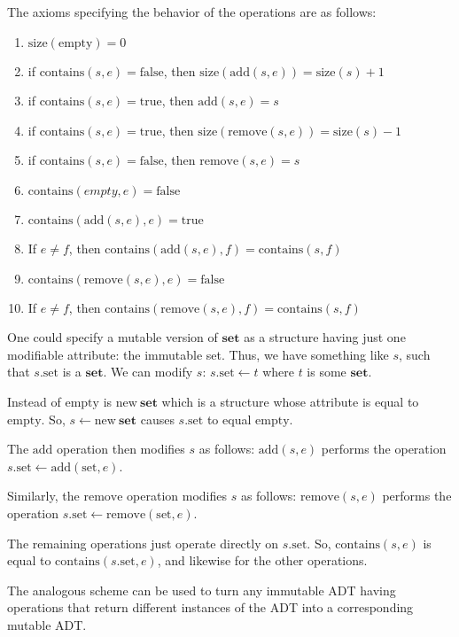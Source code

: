 \documentclass{amsart}
\begin{document}
The axioms specifying the behavior of the operations are as follows:

\begin{enumerate}
\item $\mathrm{size}(\mathrm{empty})=0$
\item if $\mathrm{contains}(s, e)=\mathrm{false}$, then $\mathrm{size}(\mathrm{add}(s, e)) = \mathrm{size}(s) + 1$
\item if $\mathrm{contains}(s, e)=\mathrm{true}$, then $\mathrm{add}(s, e) = s$
\item if $\mathrm{contains}(s, e)=\mathrm{true}$, then $\mathrm{size}(\mathrm{remove}(s, e)) = \mathrm{size}(s) - 1$
\item if $\mathrm{contains}(s, e)=\mathrm{false}$, then $\mathrm{remove}(s, e) = s$
\item $\mathrm{contains}(empty, e) = \mathrm{false}$
\item $\mathrm{contains}(\mathrm{add}(s, e), e)=\mathrm{true}$
\item If $e\ne{f}$, then $\mathrm{contains}(\mathrm{add}(s, e), f)=\mathrm{contains}(s,f)$
\item $\mathrm{contains}(\mathrm{remove}(s, e), e)=\mathrm{false}$
\item If $e\ne{f}$, then $\mathrm{contains}(\mathrm{remove}(s, e), f)=\mathrm{contains}(s,f)$
\end{enumerate}


One could specify a mutable version of $\mathbf{set}$ as a structure having just one modifiable attribute: the immutable set.  Thus, we have something like $s$, such that $s.\mathrm{set}$ is a $\mathbf{set}$.  We can modify $s$: $s.\mathrm{set} \leftarrow t$ where $t$ is some $\mathbf{set}$.

Instead of $\mathrm{empty}$ is $\mathrm{new~\mathbf{set}}$ which is a structure whose attribute is equal to $\mathrm{empty}$.    So, $s\leftarrow \mathrm{new~\mathbf{set}}$ causes $s.\mathrm{set}$ to equal $\mathrm{empty}$.

The $\mathrm{add}$ operation then modifies $s$ as follows: $\mathrm{add}(s, e)$ performs the operation $s.\mathrm{set}\leftarrow \mathrm{add}(\mathrm{set}, e)$.

Similarly, the $\mathrm{remove}$ operation modifies $s$ as follows: $\mathrm{remove}(s, e)$ performs the operation $s.\mathrm{set}\leftarrow \mathrm{remove}(\mathrm{set}, e)$.

The remaining operations just operate directly on $s.\mathrm{set}$.  So, $\mathrm{contains}(s, e)$ is equal to $\mathrm{contains}(s.\mathrm{set}, e)$, and likewise for the other operations.

The analogous scheme can be used to turn any immutable ADT having operations that return different instances of the ADT into a corresponding mutable ADT.
\end{document}
